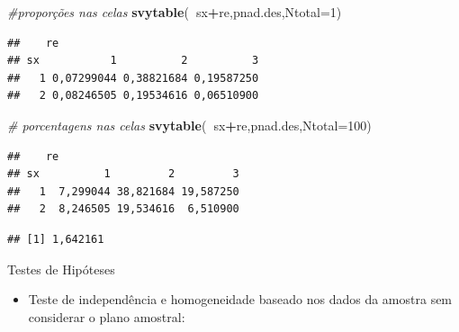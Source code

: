 \documentclass[]{book}
\newenvironment{Shaded}{\begin{snugshade}}{\end{snugshade}}
\newcommand{\KeywordTok}[1]{\textcolor[rgb]{0.13,0.29,0.53}{\textbf{#1}}}
\newcommand{\DataTypeTok}[1]{\textcolor[rgb]{0.13,0.29,0.53}{#1}}
\newcommand{\DecValTok}[1]{\textcolor[rgb]{0.00,0.00,0.81}{#1}}
\newcommand{\StringTok}[1]{\textcolor[rgb]{0.31,0.60,0.02}{#1}}
\newcommand{\CommentTok}[1]{\textcolor[rgb]{0.56,0.35,0.01}{\textit{#1}}}
\newcommand{\OperatorTok}[1]{\textcolor[rgb]{0.81,0.36,0.00}{\textbf{#1}}}
\newcommand{\NormalTok}[1]{#1}
\providecommand{\tightlist}{%
  \setlength{\itemsep}{0pt}\setlength{\parskip}{0pt}}
\theoremstyle{definition}
\theoremstyle{definition}
\theoremstyle{definition}
\theoremstyle{remark}
\let\BeginKnitrBlock\begin \let\EndKnitrBlock\end
\begin{document}
\begin{Shaded}
\begin{Highlighting}[]
\CommentTok{#proporções nas celas}
\KeywordTok{svytable}\NormalTok{(}\OperatorTok{~}\NormalTok{sx}\OperatorTok{+}\NormalTok{re,pnad.des,}\DataTypeTok{Ntotal=}\DecValTok{1}\NormalTok{)}
\end{Highlighting}
\end{Shaded}

\begin{verbatim}
##    re
## sx           1          2          3
##   1 0,07299044 0,38821684 0,19587250
##   2 0,08246505 0,19534616 0,06510900
\end{verbatim}

\begin{Shaded}
\begin{Highlighting}[]
\CommentTok{# porcentagens nas celas}
\KeywordTok{svytable}\NormalTok{(}\OperatorTok{~}\NormalTok{sx}\OperatorTok{+}\NormalTok{re,pnad.des,}\DataTypeTok{Ntotal=}\DecValTok{100}\NormalTok{)}
\end{Highlighting}
\end{Shaded}

\begin{verbatim}
##    re
## sx          1         2         3
##   1  7,299044 38,821684 19,587250
##   2  8,246505 19,534616  6,510900
\end{verbatim}

\begin{Shaded}
\end{Shaded}

\begin{verbatim}
## [1] 1,642161
\end{verbatim}

\BeginKnitrBlock{example}
\protect\hypertarget{exm:exe83}{}{\label{exm:exe83} }Testes de Hipóteses
\EndKnitrBlock{example}

\begin{itemize}
\tightlist
\item
  Teste de independência e homogeneidade baseado nos dados da amostra
  sem considerar o plano amostral:
\end{itemize}
\end{document}
